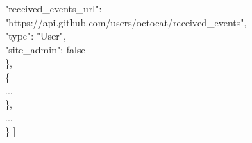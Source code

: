 \documentclass[11pt]{article}
\begin{document}
\begin{itemize}
\begin{itemize}
{{		\textcolor{r}{"received\_events\_url"}: \\\textcolor{b}{"https://api.github.com/users/octocat/received\_events"},\\
		\textcolor{r}{"type"}: \textcolor{b}{"User"},\\
		\textcolor{r}{"site\_admin"}: \textcolor{b}{false}\\
		\},\\
  		\{\\
		...\\
  		\},\\
  		...\\
		\}
		]\\ \\ \\ \\
   	 }
	}
   \end{itemize}


\end{itemize}
\end{document}
